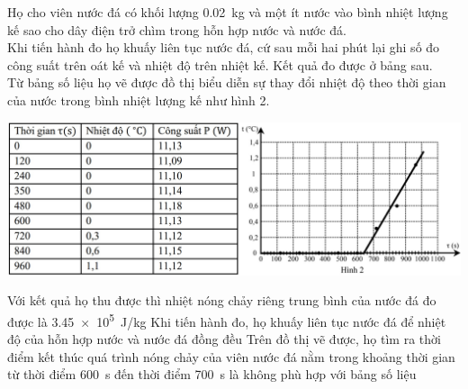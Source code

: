 \begin{ex}
	Họ cho viên nước đá có khối lượng \SI{0.02}{\kilogram} và một ít nước vào bình nhiệt lượng kế sao cho dây điện trở chìm trong hỗn hợp nước và nước đá.\\
	Khi tiến hành đo họ khuấy liên tục nước đá, cứ sau mỗi hai phút lại ghi số đo công suất trên oát kế và nhiệt độ trên nhiệt kế. Kết quả đo được ở bảng sau.\\
	Từ bảng số liệu họ vẽ được đồ thị biểu diễn sự thay đổi nhiệt độ theo thời gian của nước trong bình nhiệt lượng kế như hình 2.
	\begin{center}
		\includegraphics[scale=0.5]{figs/G12Y24B5-2}
	\end{center}
	{Với kết quả họ thu được thì nhiệt nóng chảy riêng trung bình của nước đá đo được là \SI{3.45e5}{\joule/\kilogram}}
	{\True Khi tiến hành đo, họ khuấy liên tục nước đá để nhiệt độ của hỗn hợp nước và nước đá đồng đều}
	{Trên đồ thị vẽ được, họ tìm ra thời điểm kết thúc quá trình nóng chảy của viên nước đá nằm trong khoảng thời gian từ thời điểm \SI{600}{\second} đến thời điểm \SI{700}{\second} là không phù hợp với bảng số liệu}

\end{ex}

